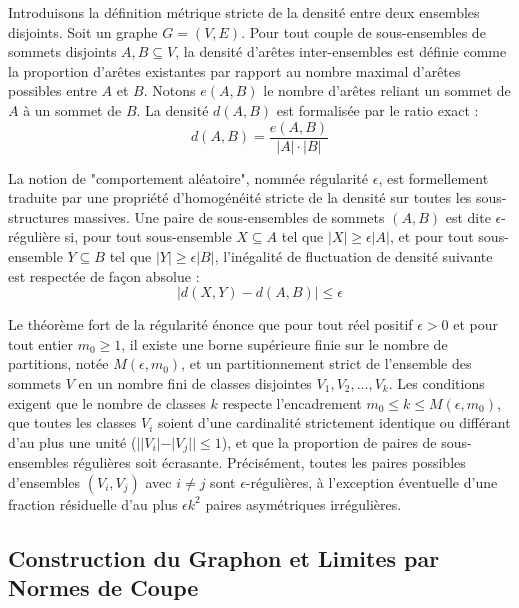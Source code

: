 \documentclass[11pt, a4paper]{article}
\begin{document}
Introduisons la définition métrique stricte de la densité entre deux ensembles disjoints.
Soit un graphe $G = (V, E)$. Pour tout couple de sous-ensembles de sommets disjoints $A, B \subseteq V$, la densité d'arêtes inter-ensembles est définie comme la proportion d'arêtes existantes par rapport au nombre maximal d'arêtes possibles entre $A$ et $B$.
Notons $e(A, B)$ le nombre d'arêtes reliant un sommet de $A$ à un sommet de $B$.
La densité $d(A, B)$ est formalisée par le ratio exact :
$$d(A, B) = \frac{e(A, B)}{|A| \cdot |B|}$$

La notion de "comportement aléatoire", nommée régularité $\epsilon$, est formellement traduite par une propriété d'homogénéité stricte de la densité sur toutes les sous-structures massives.
Une paire de sous-ensembles de sommets $(A, B)$ est dite $\epsilon$-régulière si, pour tout sous-ensemble $X \subseteq A$ tel que $|X| \ge \epsilon |A|$, et pour tout sous-ensemble $Y \subseteq B$ tel que $|Y| \ge \epsilon |B|$, l'inégalité de fluctuation de densité suivante est respectée de façon absolue :
$$|d(X, Y) - d(A, B)| \le \epsilon$$

Le théorème fort de la régularité énonce que pour tout réel positif $\epsilon > 0$ et pour tout entier $m_0 \ge 1$, il existe une borne supérieure finie sur le nombre de partitions, notée $M(\epsilon, m_0)$, et un partitionnement strict de l'ensemble des sommets $V$ en un nombre fini de classes disjointes $V_1, V_2, \dots, V_k$.
Les conditions exigent que le nombre de classes $k$ respecte l'encadrement $m_0 \le k \le M(\epsilon, m_0)$, que toutes les classes $V_i$ soient d'une cardinalité strictement identique ou différant d'au plus une unité ($||V_i| - |V_j|| \le 1$), et que la proportion de paires de sous-ensembles régulières soit écrasante.
Précisément, toutes les paires possibles d'ensembles $(V_i, V_j)$ avec $i \neq j$ sont $\epsilon$-régulières, à l'exception éventuelle d'une fraction résiduelle d'au plus $\epsilon k^2$ paires asymétriques irrégulières.

\subsection{Construction du Graphon et Limites par Normes de Coupe}
\end{document}
